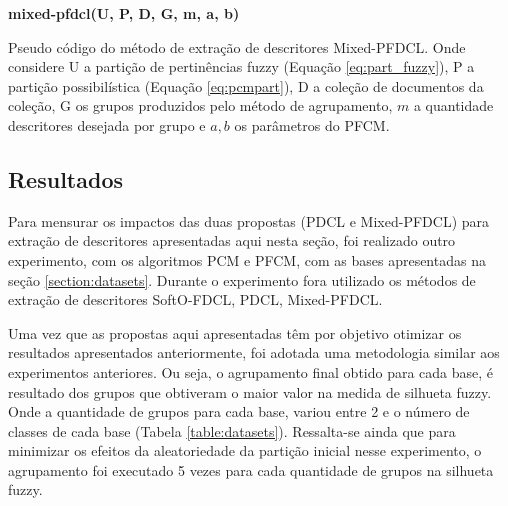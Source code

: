 \begin{algorithm}[!htp] 
  \SetAlgoLined 
  \textbf{{\color{blue}mixed-pfdcl}(U, P, D, G, m, a, b)}\\
  \caption{Pseudo código do método de extração de descritores Mixed-PFDCL. Onde
    considere U a
  partição de pertinências fuzzy (Equação \ref{eq:part_fuzzy}), P a partição
  possibilística (Equação \ref{eq:pcmpart}), D a coleção de documentos da coleção, G os grupos
produzidos pelo método de agrupamento, $m$ a quantidade descritores desejada por grupo e $a,b$ os
parâmetros do PFCM.}
\label{alg:mixedpfdcl} 
\end{algorithm}

\subsection{Resultados}

Para mensurar os impactos das duas propostas (PDCL e Mixed-PFDCL) para extração de descritores apresentadas
aqui nesta seção, foi realizado outro experimento, com os algoritmos PCM e PFCM, com as bases
apresentadas na seção \ref{section:datasets}. Durante o experimento fora utilizado os métodos de
extração de descritores SoftO-FDCL, PDCL, Mixed-PFDCL. 

Uma vez que as propostas aqui apresentadas têm por objetivo otimizar os resultados apresentados
anteriormente, foi adotada uma metodologia similar aos experimentos anteriores. Ou seja, o agrupamento
final obtido para cada base, é resultado dos grupos que obtiveram o maior valor na medida de
silhueta fuzzy. Onde a quantidade de grupos para cada base, variou entre 2 e o número de classes
de cada base (Tabela \ref{table:datasets}). Ressalta-se ainda que para minimizar os efeitos da
aleatoriedade da partição inicial nesse experimento, o agrupamento foi executado 5 vezes para cada
quantidade de grupos na silhueta fuzzy. 

